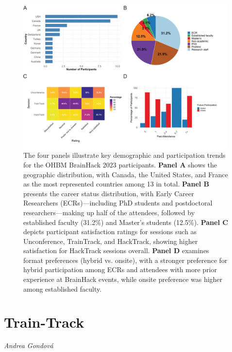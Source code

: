 \documentclass{article}
\newcommand\coordinator[1]{\begin{flushleft}\small\textit{#1}\end{flushleft}}
\begin{document}
\begin{figure}[hbt!]
    \centering
    \includegraphics[width=0.99\textwidth]{images/demographics.png}
    \caption{
        The four panels illustrate key demographic and participation trends for the OHBM BrainHack 2023 participants.
        \textbf{Panel A} shows the geographic distribution, with Canada, the United States, and France as the most represented countries among 13 in total.
        \textbf{Panel B} presents the career status distribution, with Early Career Researchers (ECRs)—including PhD students and postdoctoral researchers—making up half of the attendees, followed by established faculty (31.2\%) and Master's students (12.5\%).
        \textbf{Panel C} depicts participant satisfaction ratings for sessions such as Unconference, TrainTrack, and HackTrack, showing higher satisfaction for HackTrack sessions overall.
        \textbf{Panel D} examines format preferences (hybrid vs. onsite), with a stronger preference for hybrid participation among ECRs and attendees with more prior experience at BrainHack events, while onsite preference was higher among established faculty.
    }
    \label{fig:demographics}
\end{figure}

\pagebreak

\section{Train-Track}
\coordinator{Andrea Gondová}
\end{document}
